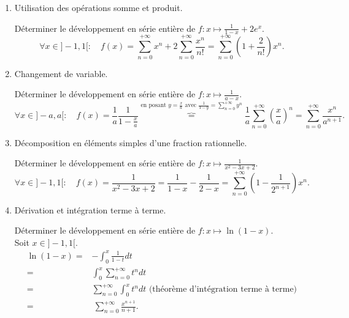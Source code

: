 \documentclass{book}
\begin{document}
\begin{enumerate}
\item Utilisation des opérations somme et produit.\\
\begin{Exemple} Déterminer le développement en série entière de $f : x \mapsto \frac{1}{1-x} + 2e^x.$
$$\forall x\in]-1,1[:\quad f(x)=\sum_{n=0}^{+\infty} x^n +2\sum_{n=0}^{+\infty} \frac{x^n}{n!}=\sum_{n=0}^{+\infty} (1+\frac{2}{n!})x^n.$$
\end{Exemple}
\item Changement de variable.\\
\begin{Exemple} Déterminer le développement en série entière de $f : x \mapsto \frac{1}{a-x} .$
$$\forall x\in]-a,a[:\quad f(x)=\frac{1}{a}\frac{1}{1-\frac x a}\overbrace{=}^{\text{en posant }y=\frac x a \text{ avec } \frac{1}{1-y}=\sum\limits_{n=0}^{+\infty} y^n} \frac{1}{a}\sum_{n=0}^{+\infty} \left(\frac{x}{a}\right)^n =  \sum_{n=0}^{+\infty} \frac{x^n}{a^{n+1}}  .$$
\end{Exemple}
\item Décomposition en éléments simples d'une fraction rationnelle.\\
\begin{Exemple} Déterminer le développement en série entière de $f : x \mapsto \frac{1}{x^2-3x+2} .$
$$\forall x\in]-1,1[:\quad f(x)= \frac{1}{x^2-3x+2} =\frac{1}{1-x}-\frac{1}{2-x}= \sum_{n=0}^{+\infty} (1-\frac{1}{2^{n+1}})x^n .$$
\end{Exemple}

\item  Dérivation et intégration terme à terme.
\begin{Exemple} Déterminer le développement en série entière de $f : x \mapsto \ln(1-x).$\\
Soit $x\in]-1,1[$.
$$\begin{aligned} 
 \ln(1-x) =&-\int_0^x \frac{1}{1-t}dt\\
  =& \int_0^x \sum_{n=0}^{+\infty} t^n dt \\
 =& \sum_{n=0}^{+\infty} \int_0^x t^n dt \text{ (théorème d'intégration terme à terme)}\\
 =&\ \sum_{n=0}^{+\infty} \frac{x^{n+1}}{n+1}.
 \end{aligned}$$
\end{Exemple}


\end{enumerate}
\end{document}
